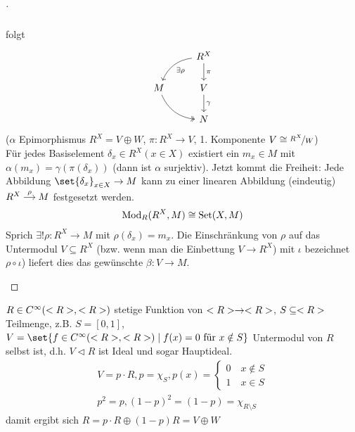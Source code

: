 \begin{proof}[]
\begin{enumerate}
\[\begin{tikzcd}[ampersand replacement=\&]
			\end{tikzcd}
		\]
		folgt
		\[
			\begin{tikzcd}[ampersand replacement=\&]
			\& R^X \arrow[ld, "\exists \rho", bend right] \arrow[d, "\pi"] \\
			M \arrow[rd, two heads, bend right] \& V \arrow[d, "\gamma"]                                       \\
			\& N                                                          
			\end{tikzcd}
		\]
		($\alpha$ Epimorphismus $R^X = V \oplus W$, $\pi \colon R^X \to V$, 1. Komponente $V \cong \lnkset{R^X}{W}$)\\
		Für jedes Basiselement $\delta_x \in R^X (x \in X)$ existiert ein $m_x \in M$ mit $\alpha(m_x) = \gamma(\pi(\delta_x))$ (dann ist $\alpha$ surjektiv). Jetzt kommt die Freiheit: Jede Abbildung $\set{\delta_x}_{x \in X} \to M$ kann zu einer linearen Abbildung (eindeutig) $\begin{tikzcd}[cramped, sep=small]
		R^X \arrow[r, "\rho"] & M
		\end{tikzcd}$ festgesetzt werden.
		\begin{align*}
			\operatorname{Mod}_R(R^X, M) \cong \operatorname{Set}(X,M)
		\end{align*}
		Sprich $\exists! \rho \colon R^X \to M$ mit $\rho(\delta_x) = m_x$. Die Einschränkung von $\rho$ auf das Untermodul $V \subseteq R^X$ (bzw. wenn man die Einbettung $V \to R^X$) mit $\iota$ bezeichnet $\rho \circ \iota$)  liefert dies das gewünschte $\beta\colon V \to M$.
	\end{enumerate}
\end{proof}
\begin{example}
	$R \in C^{\infty}(<R>, <R>)$ stetige Funktion von $<R> \to <R>$, $S \subseteq <R>$ Teilmenge, z.B. $S = [0,1]$,\\ $V = \set{f \in C^{\infty}(\R, \R) \mid f(x) = 0 \text{ für }x \notin S}$ Untermodul von $R$ selbst ist, d.h. $V \lhd R$ ist Ideal und sogar Hauptideal.
	\begin{align*}
		V = p \cdot R, p = \chi_S, p(x) = \begin{cases}
		0 \quad x \notin S\\
		1 \quad x \in S
		\end{cases}\\
		p^2 = p, (1-p)^2 = (1-p) = \chi_{R \setminus S}
	\end{align*}
	damit ergibt sich $R = p \cdot R \oplus (1-p)R = V \oplus W$ 
\end{example}
